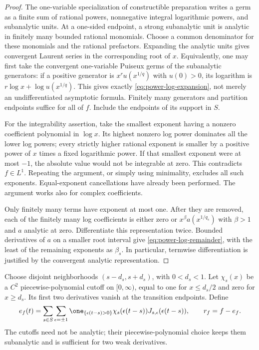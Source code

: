 \begin{proof}
The one-variable specialization of constructible preparation
\cite[Theorem 3.11]{CMInt} writes a germ as a finite sum of rational
powers, nonnegative integral logarithmic powers, and subanalytic units.
At a one-sided endpoint, a strong subanalytic unit is analytic in
finitely many bounded rational monomials. Choose a common denominator
for these monomials and the rational prefactors. Expanding the analytic
units gives convergent Laurent series in the corresponding root of $x$.
Equivalently, one may first take the convergent one-variable Puiseux
germs of the subanalytic generators: if a positive generator is
$x^r u(x^{1/q})$ with $u(0)>0$, its logarithm is
$r\log x+\log u(x^{1/q})$. This gives exactly
\eqref{eq:power-log-expansion}, not merely an undifferentiated asymptotic
formula. Finitely many generators and partition endpoints suffice for
all of $f$. Include the endpoints of its support in $S$.

For the integrability assertion, take the smallest exponent having a
nonzero coefficient polynomial in $\log x$. Its highest nonzero log
power dominates all the lower log powers; every strictly higher
rational exponent is smaller by a positive power of $x$ times a fixed
logarithmic power. If that smallest exponent were at most $-1$, the
absolute value would not be integrable at zero. This contradicts
$f\in L^1$. Repeating the argument, or simply using minimality, excludes
all such exponents. Equal-exponent cancellations have already been
performed. The argument works also for complex coefficients.

Only finitely many terms have exponent at most one. After they are
removed, each of the finitely many log coefficients is either zero or
$x^{\beta}a(x^{1/q_s})$ with $\beta>1$ and $a$ analytic at zero.
Differentiate this representation twice. Bounded derivatives of $a$ on
a smaller root interval give \eqref{eq:power-log-remainder}, with the
least of the remaining exponents as $\beta_s$. In particular, termwise
differentiation is justified by the convergent analytic representation.
\end{proof}

Choose disjoint neighborhoods $(s-d_s,s+d_s)$, with $0<d_s<1$.
Let $\chi_s(x)$ be a $C^2$ piecewise-polynomial cutoff on $[0,\infty)$,
equal to one for $x\le d_s/2$ and zero for $x\ge d_s$. Its first two
derivatives vanish at the transition endpoints. Define
\begin{equation}\label{eq:full-finite-jet-density}
 e_f(t)=\sum_{s\in S}\sum_{\epsilon=\pm1}
  \one_{\{\epsilon(t-s)>0\}}\chi_s(\epsilon(t-s))
                         J_{s,\epsilon}(\epsilon(t-s)),
 \qquad r_f=f-e_f.
\end{equation}
The cutoffs need not be analytic; their piecewise-polynomial choice
keeps them subanalytic and is sufficient for two weak derivatives.

